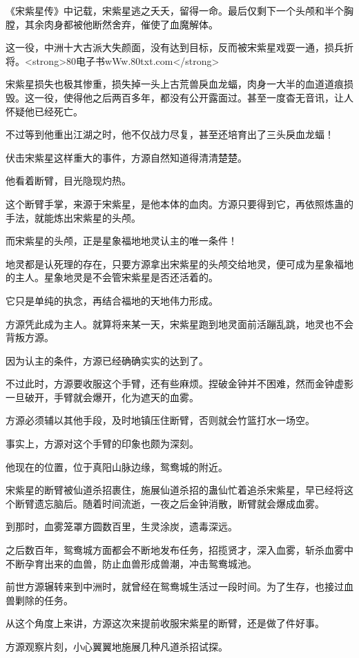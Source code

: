 \begin{this_body}
《宋紫星传》中记载，宋紫星逃之夭夭，留得一命。最后仅剩下一个头颅和半个胸膛，其余肉身都被他断然舍弃，催使了血魔解体。

这一役，中洲十大古派大失颜面，没有达到目标，反而被宋紫星戏耍一通，损兵折将。<strong>80电子书wWw.80txt.com</strong>

宋紫星损失也极其惨重，损失掉一头上古荒兽戾血龙蝠，肉身一大半的血道道痕损毁。这一役，使得他之后两百多年，都没有公开露面过。甚至一度杳无音讯，让人怀疑他已经死亡。

不过等到他重出江湖之时，他不仅战力尽复，甚至还培育出了三头戾血龙蝠！

伏击宋紫星这样重大的事件，方源自然知道得清清楚楚。

他看着断臂，目光隐现灼热。

这个断臂手掌，来源于宋紫星，是他本体的血肉。方源只要得到它，再依照炼蛊的手法，就能炼出宋紫星的头颅。

而宋紫星的头颅，正是星象福地地灵认主的唯一条件！

地灵都是认死理的存在，只要方源拿出宋紫星的头颅交给地灵，便可成为星象福地的主人。星象地灵是不会管宋紫星是否还活着的。

它只是单纯的执念，再结合福地的天地伟力形成。

方源凭此成为主人。就算将来某一天，宋紫星跑到地灵面前活蹦乱跳，地灵也不会背叛方源。

因为认主的条件，方源已经确确实实的达到了。

不过此时，方源要收服这个手臂，还有些麻烦。捏破金钟并不困难，然而金钟虚影一旦破开，手臂就会爆开，化为遮天的血雾。

方源必须辅以其他手段，及时地镇压住断臂，否则就会竹篮打水一场空。

事实上，方源对这个手臂的印象也颇为深刻。

他现在的位置，位于真阳山脉边缘，鸳鸯城的附近。

宋紫星的断臂被仙道杀招裹住，施展仙道杀招的蛊仙忙着追杀宋紫星，早已经将这个断臂遗忘脑后。随着时间流逝，一夜之后金钟消散，断臂就会爆成血雾。

到那时，血雾笼罩方圆数百里，生灵涂炭，遗毒深远。

之后数百年，鸳鸯城方面都会不断地发布任务，招揽贤才，深入血雾，斩杀血雾中不断孕育出来的血兽，防止血兽形成兽潮，冲击鸳鸯城池。

前世方源辗转来到中洲时，就曾经在鸳鸯城生活过一段时间。为了生存，也接过血兽剿除的任务。

从这个角度上来讲，方源这次来提前收服宋紫星的断臂，还是做了件好事。

方源观察片刻，小心翼翼地施展几种凡道杀招试探。


\end{this_body}
